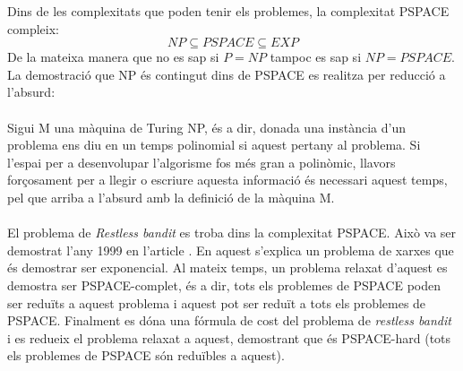 
Dins de les complexitats que poden tenir els problemes, la complexitat PSPACE compleix:
\[
{NP} \subseteq PSPACE \subseteq {EXP} %
\]
De la mateixa manera que no es sap si $P = NP$ tampoc es sap si $NP = PSPACE$. La demostració que NP és contingut dins de
PSPACE es realitza per reducció a l'absurd:\\
\\
Sigui M una màquina de Turing NP, és a dir, donada una instància d'un problema ens diu en un temps
polinomial si aquest pertany al problema. Si l'espai per a desenvolupar l'algorisme fos més gran a polinòmic, llavors forçosament
per a llegir o escriure aquesta informació és necessari aquest temps, pel que arriba a l'absurd amb la definició de la màquina M. %
\\
\\
El problema de \textit{Restless bandit} es troba dins la complexitat PSPACE. Això va ser demostrat l'any 1999 en l'article \cite{pspace}.%
En aquest s'explica un problema de xarxes que és demostrar ser exponencial. Al mateix temps, un problema relaxat d'aquest
es demostra ser PSPACE-complet, és a dir, tots els problemes de PSPACE poden ser reduïts a aquest problema i aquest pot
ser reduït a tots els problemes de PSPACE. Finalment es dóna una fórmula de cost del problema de \textit{restless bandit} i
es redueix el problema relaxat a aquest, demostrant que és PSPACE-hard (tots els problemes de PSPACE són
reduïbles a aquest). %

